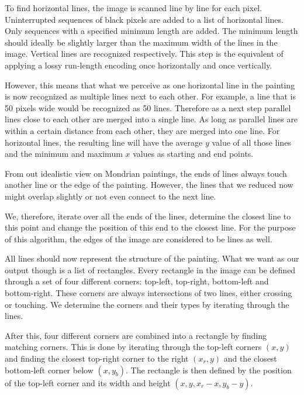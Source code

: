 
To find horizontal lines, the image is scanned line by line for each pixel.
Uninterrupted sequences of black pixels are added to a list of horizontal lines.
Only sequences with a specified minimum length are added. The minimum length
should ideally be slightly larger than the maximum width of the lines in the
image. Vertical lines are recognized respectively. This step is the equivalent of
applying a lossy run-length encoding once horizontally and once vertically.

However, this means that what we perceive as one horizontal line in the painting
is now recognized as multiple lines next to each other. For example, a line that
is 50 pixels wide would be recognized as 50 lines. Therefore as a next step
parallel lines close to each other are merged into a single line. As long as
parallel lines are within a certain distance from each other, they are merged
into one line. For horizontal lines, the resulting line will have the average
$y$ value of all those lines and the minimum and maximum $x$ values as starting
and end points.

From out idealistic view on Mondrian paintings, the ends of lines always touch
another line or the edge of the painting. However, the lines that we reduced now
might overlap slightly or not even connect to the next line.


We, therefore, iterate over all the ends of the lines, determine the closest
line to this point and change the position of this end to the closest line. For
the purpose of this algorithm, the edges of the image are considered to be lines
as well.


All lines should now represent the structure of the painting. What we want as
our output though is a list of rectangles. Every rectangle in the image can be
defined through a set of four different corners: top-left, top-right,
bottom-left and bottom-right. These corners are always intersections of two
lines, either crossing or touching. We determine the corners and their types by
iterating through the lines.

After this, four different corners are combined into a rectangle by finding
matching corners. This is done by iterating through the top-left corners $(x,y)$
and finding the closest top-right corner to the right $(x_r, y)$ and the
closest bottom-left corner below $(x, y_b)$. The rectangle is then defined by
the position of the top-left corner and its width and height
$(x,y,x_r-x,y_b-y)$.

